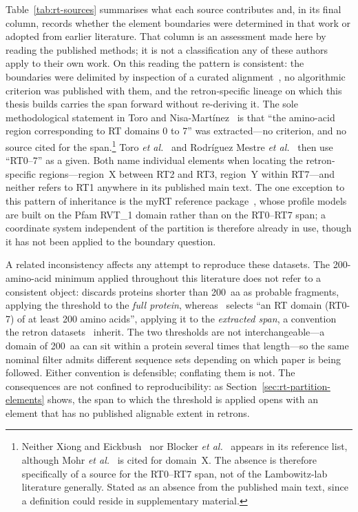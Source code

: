 Table~\ref{tab:rt-sources} summarises what each source contributes and, in its final
column, records whether the element boundaries were determined in that work or adopted
from earlier literature. That column is an assessment made here by reading the published
methods; it is not a classification any of these authors apply to their own work. On this
reading the pattern is consistent: the boundaries were delimited by inspection of a
curated alignment~\cite{xiong1990}, no algorithmic criterion was published with them, and
the retron-specific lineage on which this thesis builds carries the span forward without
re-deriving it. The sole methodological statement in Toro and
Nisa-Mart{\'i}nez~\cite{toro2014} is that ``the amino-acid region corresponding to RT
domains 0 to 7'' was extracted---no criterion, and no source cited for the
span.\footnote{Neither Xiong and Eickbush~\cite{xiong1990} nor Blocker
\textit{et al.}~\cite{blocker2005} appears in its reference list, although
Mohr \textit{et al.}~\cite{mohr1993} is cited for domain~X. The absence is therefore
specifically of a source for the RT0--RT7 span, not of the Lambowitz-lab literature
generally. Stated as an absence from the published main text, since a definition could
reside in supplementary material.} Toro \textit{et al.}~\cite{toro2019} and
Rodr{\'i}guez Mestre \textit{et al.}~\cite{mestre2020} then use ``RT0--7'' as a given.
Both name individual elements when locating the retron-specific regions---region~X
between RT2 and RT3, region~Y within RT7---and neither refers to RT1 anywhere in its
published main text. The one exception to this pattern of inheritance is the myRT
reference package~\cite{sharifi2022}, whose profile models are built on the Pfam RVT\_1
domain rather than on the RT0--RT7 span; a coordinate system independent of the
partition is therefore already in use, though it has not been applied to the boundary
question.

A related inconsistency affects any attempt to reproduce these datasets. The
200-amino-acid minimum applied throughout this literature does not refer to a consistent
object: \cite{toro2014} discards proteins shorter than 200~aa as probable fragments,
applying the threshold to the \emph{full protein}, whereas~\cite{toro2019} selects
``an RT domain (RT0-7) of at least 200 amino acids'', applying it to the \emph{extracted
span}, a convention the retron datasets~\cite{mestre2020} inherit. The two thresholds are
not interchangeable---a domain of 200~aa can sit within a protein several times that
length---so the same nominal filter admits different sequence sets depending on which
paper is being followed. Either convention is defensible; conflating them is not. The
consequences are not confined to reproducibility: as Section~\ref{sec:rt-partition-elements}
shows, the span to which the threshold is applied opens with an element that has no
published alignable extent in retrons.

